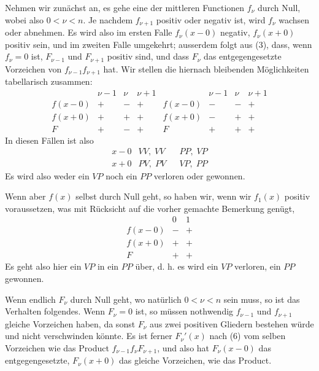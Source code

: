 \documentclass[11pt]{article}
\begin{document}
Nehmen wir zunächst an, es gehe eine der mittleren Functionen $f_\nu$ durch Null, wobei also $0<\nu<n$. Je nachdem $f_{\nu+1}$ positiv oder negativ ist, wird $f_\nu$ wachsen oder abnehmen. Es wird also im ersten Falle $f_\nu(x-0)$ negativ, $f_\nu(x+0)$ positiv sein, und im zweiten Falle umgekehrt; ausserdem folgt aus (3), dass, wenn $f_\nu=0$ ist, $F_{\nu-1}$ und $F_{\nu+1}$ positiv sind, und dass $F_\nu$ das entgegengesetzte Vorzeichen von $f_{\nu-1}f_{\nu+1}$ hat. Wir stellen die hiernach bleibenden Möglichkeiten tabellarisch zusammen:
\[
\begin{array}{c|ccc||c|ccc}
 &\nu-1&\nu&\nu+1& &\nu-1&\nu&\nu+1\\ \hline
f(x-0)&+&-&+& f(x-0)&-&-&+\\
f(x+0)&+&+&+& f(x+0)&-&+&+\\ \hline
F&+&-&+&F&+&+&+
\end{array}
\]
In diesen Fällen ist also
\[
\begin{array}{c|cc|cc}
x-0&VV,\;VV& &PP,\;VP\\
x+0&PV,\;PV& &VP,\;PP
\end{array}
\]
Es wird also weder ein $VP$ noch ein $PP$ verloren oder gewonnen.

Wenn aber $f(x)$ selbst durch Null geht, so haben wir, wenn wir $f_1(x)$ positiv voraussetzen, was mit Rücksicht auf die vorher gemachte Bemerkung genügt,
\[
\begin{array}{c|cc}
&0&1\\ \hline
f(x-0)&-&+\\
f(x+0)&+&+\\ \hline
F&+&+
\end{array}
\]
Es geht also hier ein $VP$ in ein $PP$ über, d. h. es wird ein $VP$ verloren, ein $PP$ gewonnen.

Wenn endlich $F_\nu$ durch Null geht, wo natürlich $0<\nu<n$ sein muss, so ist das Verhalten folgendes. Wenn $F_\nu=0$ ist, so müssen nothwendig $f_{\nu-1}$ und $f_{\nu+1}$ gleiche Vorzeichen haben, da sonst $F_\nu$ aus zwei positiven Gliedern bestehen würde und nicht verschwinden könnte. Es ist ferner $F_\nu'(x)$ nach (6) vom selben Vorzeichen wie das Product $f_{\nu-1}f_\nu F_{\nu+1}$, und also hat $F_\nu(x-0)$ das entgegengesetzte, $F_\nu(x+0)$ das gleiche Vorzeichen, wie das Product.
\end{document}
